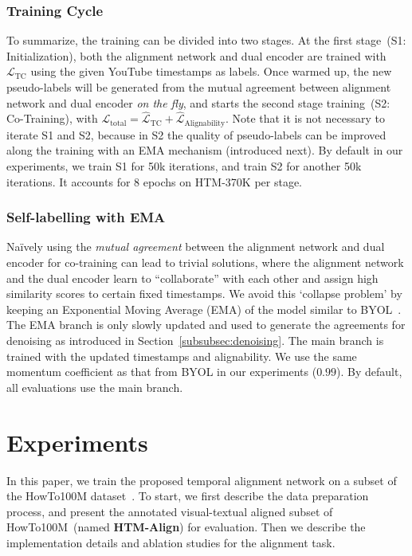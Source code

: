 \vspace{-10pt}
\subsubsection{Training Cycle}
\vspace{-2mm}
To summarize, the training can be divided into two stages. At the first stage~({S1: Initialization}), 
both the alignment network and dual encoder are trained with ${\mathcal{L}}_{\text{TC}}$ using the given YouTube timestamps as labels.
Once warmed up, 
the new pseudo-labels will be generated from the mutual agreement 
between alignment network and dual encoder \emph{on the fly}, 
and starts the second stage training~({S2: Co-Training}),
with $\mathcal{L}_{\text{total}} = \hat{\mathcal{L}}_{\text{TC}} +
\hat{\mathcal{L}}_{\text{Alignability}}$.
Note that it is not necessary to iterate S1 and S2,
because in S2 the quality of pseudo-labels can be improved 
along the training with an EMA mechanism (introduced next).
By default in our experiments,
we train S1 for 50k iterations, 
and train S2 for another 50k iterations.
It accounts for 8 epochs on HTM-370K per stage. 

\vspace{-12pt}
\subsubsection{ \noindent \textbf{Self-labelling with EMA }}
\vspace{-2mm}
Na\"ively using the {\em mutual agreement}
between the alignment network and dual encoder
for co-training can lead to trivial solutions,
where the alignment network and the dual encoder learn to ``collaborate'' with each other
and assign high similarity scores to certain fixed timestamps.
We avoid this `collapse problem'  by keeping an Exponential Moving Average (EMA) of the model 
similar to BYOL~\cite{Grill2020byol}.
The EMA branch is only slowly updated and used to generate the agreements for denoising 
as introduced in Section~\ref{subsubsec:denoising}. 
The main branch is trained with the updated timestamps and alignability.
We use the same momentum coefficient as that from BYOL in our experiments ($0.99$).
By default, all evaluations use the main branch. %
\vspace{-2mm}
\section{Experiments}
\vspace{-1mm}
In this paper, 
we train the proposed temporal alignment network on a subset of the HowTo100M dataset~\cite{Miech19}.
To start, we first describe the data preparation process,
and present the annotated visual-textual aligned subset of HowTo100M~(named \textbf{HTM-Align}) for evaluation.
Then we describe the implementation details and ablation studies for the alignment task. 

